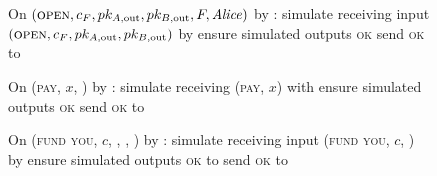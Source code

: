\begin{figure}[H]
  \begin{simulatorbox}{\simulator}
    \begin{algorithmic}[1]
      \State On $(\textsc{open}, c_F, pk_{A, \mathrm{out}}, pk_{B,
      \mathrm{out}}, F, \mathit{Alice})$ by \fchan:
      \Indent
        \State simulate \alice receiving input $(\textsc{open}, c_F, pk_{A,
        \mathrm{out}}, pk_{B, \mathrm{out}})$ by \environment
        \State ensure simulated \alice outputs \textsc{ok}
        \State send \textsc{ok} to \fchan
      \EndIndent
      \Statex

      \State On (\textsc{pay}, $x$, \dave) by \fchan:
      \Indent
        \State simulate receiving (\textsc{pay}, $x$) with \dave
        \State ensure simulated \dave outputs \textsc{ok}
        \State send \textsc{ok} to \fchan
      \EndIndent
      \Statex

      \State On (\textsc{fund you}, $c$, \bob, \charlie, \alice) by \fchan:
      \Indent
        \State simulate \alice receiving input (\textsc{fund you}, $c$, \bob) by
        \charlie
        \State ensure simulated \alice outputs \textsc{ok} to \charlie
        \State send \textsc{ok} to \fchan
      \EndIndent
    \end{algorithmic}
  \end{simulatorbox}
  \caption{}
  \label{code:simulator}
\end{figure}
